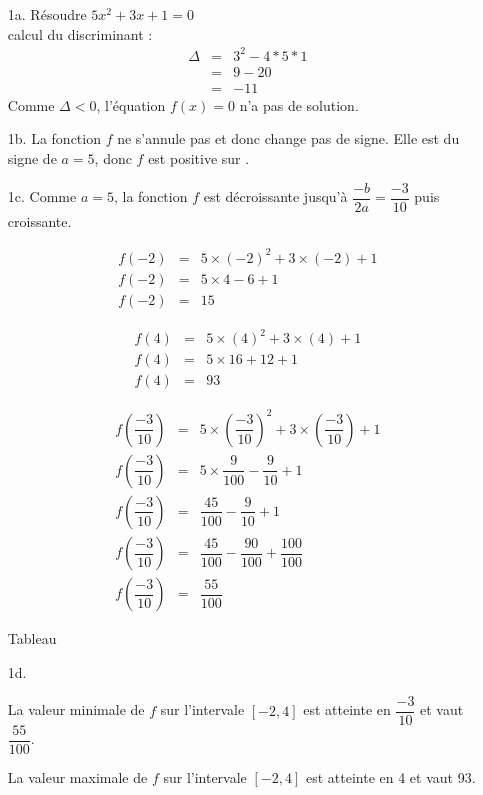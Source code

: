 \documentclass[11pt]{article}
\begin{document}
\begin{enumerate}
\item[1a.] Résoudre $5x^2 +3x + 1 = 0$\\
  calcul du discriminant :
  \begin{eqnarray*}
    \Delta &=& 3^2 - 4*5*1\\
    &=& 9 - 20\\
    &=& -11
  \end{eqnarray*}
  Comme $\Delta < 0$, l'équation $f(x) =0 $ n'a pas de solution.

\item[1b.] La fonction $f$ ne s'annule pas et donc change pas de signe. Elle est du signe de $a=5$, donc $f$ est positive sur \degree.

\item[1c.] Comme $a=5$, la fonction $f$ est décroissante jusqu'à $\dfrac{-b}{2a} = \dfrac{-3}{10}$ puis croissante.\\

  \begin{multicols}{2}
    \begin{eqnarray*}
      f(-2) &=& 5 \times (-2)^2 + 3 \times (-2) + 1 \\
      f(-2) &=& 5 \times 4 - 6 + 1 \\
      f(-2) &=& 15
    \end{eqnarray*}

    \begin{eqnarray*}
      f(4) &=& 5 \times (4)^2 + 3 \times (4) + 1 \\
      f(4) &=& 5 \times 16 + 12 + 1 \\
      f(4) &=& 93
    \end{eqnarray*}

    \begin{eqnarray*}
      f(\dfrac{-3}{10}) &=& 5 \times (\dfrac{-3}{10})^2 + 3 \times (\dfrac{-3}{10}) + 1 \\
      f(\dfrac{-3}{10}) &=& 5 \times \dfrac{9}{100} - \dfrac{9}{10} + 1 \\
      f(\dfrac{-3}{10}) &=& \dfrac{45}{100} - \dfrac{9}{10} + 1 \\
      f(\dfrac{-3}{10}) &=& \dfrac{45}{100} - \dfrac{90}{100} + \dfrac{100}{100} \\
      f(\dfrac{-3}{10}) &=& \dfrac{55}{100}
    \end{eqnarray*}
  \end{multicols}

  Tableau\\


\item[1d.] 

  La valeur minimale de $f$ sur l'intervale $[-2, 4]$ est atteinte en $\dfrac{-3}{10}$ et vaut $\dfrac{55}{100}$.

  La valeur maximale de $f$ sur l'intervale $[-2, 4]$ est atteinte en 4 et vaut 93.

\end{enumerate}
\end{document}
